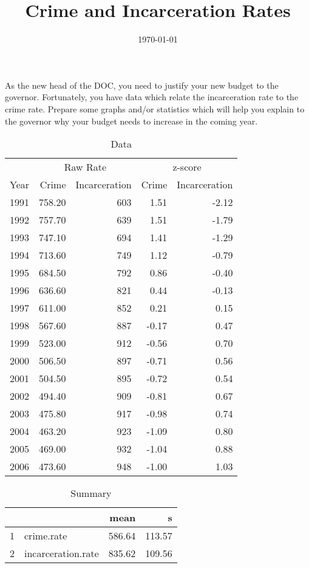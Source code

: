 \documentclass{exam}
\author{}
\title{Crime and Incarceration Rates}
\date{\today}
\begin{document}
  \maketitle

  As the new head of the DOC, you need to justify your new budget to the
  governor.  Fortunately, you have data which relate the incarceration rate to
  the crime rate.  Prepare some graphs and/or statistics which will help you
  explain to the governor why your budget needs to increase in the coming year.

  \begin{table}[H]
    \centering
    \begin{tabular}{rrrrr}
      \toprule
      & \multicolumn{2}{c}{Raw Rate} & \multicolumn{2}{c}{z-score } \\
      \cmidrule(r){2-3} \cmidrule(r){4-5} 
      Year & Crime  & Incarceration & Crime & Incarceration \\
      \midrule
      1991 & 758.20 & 603           & 1.51  & -2.12 \\
      1992 & 757.70 & 639           & 1.51  & -1.79 \\
      1993 & 747.10 & 694           & 1.41  & -1.29 \\
      1994 & 713.60 & 749           & 1.12  & -0.79 \\
      1995 & 684.50 & 792           & 0.86  & -0.40 \\
      1996 & 636.60 & 821           & 0.44  & -0.13 \\
      1997 & 611.00 & 852           & 0.21  & 0.15 \\
      1998 & 567.60 & 887           & -0.17 & 0.47 \\
      1999 & 523.00 & 912           & -0.56 & 0.70 \\
      2000 & 506.50 & 897           & -0.71 & 0.56 \\
      2001 & 504.50 & 895           & -0.72 & 0.54 \\
      2002 & 494.40 & 909           & -0.81 & 0.67 \\
      2003 & 475.80 & 917           & -0.98 & 0.74 \\
      2004 & 463.20 & 923           & -1.09 & 0.80 \\
      2005 & 469.00 & 932           & -1.04 & 0.88 \\
      2006 & 473.60 & 948           & -1.00 & 1.03 \\
      \bottomrule
    \end{tabular}
    \caption{Data}
  \end{table}

  \begin{table}[ht]
    \centering
    \begin{tabular}{rlrr}
      \toprule
        &                    & mean   & s \\
      \midrule
      1 & crime.rate         & 586.64 & 113.57 \\
      2 & incarceration.rate & 835.62 & 109.56 \\
      \bottomrule
    \end{tabular}
    \caption{Summary}
  \end{table}
\end{document}
